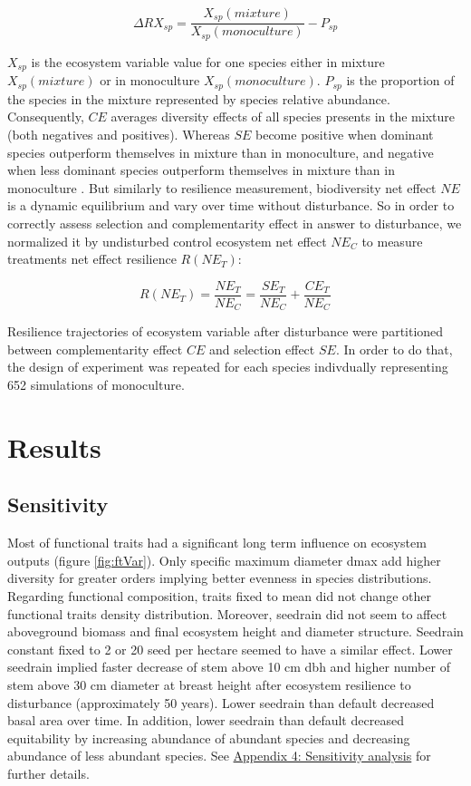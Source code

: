 \documentclass[12pt,]{article}
\let\oldsection\section
\renewcommand\section{\newpage\oldsection}
\theoremstyle{definition}
\theoremstyle{definition}
\theoremstyle{remark}
\begin{document}
\begin{equation}
  \Delta RX_{sp} = \frac{X_{sp}(mixture)}{X_{sp}(monoculture)} - P_{sp}
  \label{eq:DeltaRY}
\end{equation}

\(X_{sp}\) is the ecosystem variable value for one species either in
mixture \(X_{sp}(mixture)\) or in monoculture \(X_{sp}(monoculture)\).
\(P_{sp}\) is the proportion of the species in the mixture represented
by species relative abundance. Consequently, \(CE\) averages diversity
effects of all species presents in the mixture (both negatives and
positives). Whereas \(SE\) become positive when dominant species
outperform themselves in mixture than in monoculture, and negative when
less dominant species outperform themselves in mixture than in
monoculture \citep{Tobner2016}. But similarly to resilience measurement,
biodiversity net effect \(NE\) is a dynamic equilibrium and vary over
time without disturbance. So in order to correctly assess selection and
complementarity effect in answer to disturbance, we normalized it by
undisturbed control ecosystem net effect \(NE_C\) to measure treatments
net effect resilience \(R(NE_T)\):

\begin{equation}
  R(NE_T) = \frac{NE_T}{NE_C} = \frac{SE_T}{NE_C} + \frac{CE_T}{NE_C}
  \label{eq:RNE}
\end{equation}

Resilience trajectories of ecosystem variable after disturbance were
partitioned between complementarity effect \(CE\) and selection effect
\(SE\). In order to do that, the design of experiment was repeated for
each species indivdually representing 652 simulations of monoculture.

\section{Results}\label{results}

\subsection{Sensitivity}\label{sensitivity}

Most of functional traits had a significant long term influence on
ecosystem outputs (figure \ref{fig:ftVar}). Only specific maximum
diameter dmax add higher diversity for greater orders implying better
evenness in species distributions. Regarding functional composition,
traits fixed to mean did not change other functional traits density
distribution. Moreover, seedrain did not seem to affect aboveground
biomass and final ecosystem height and diameter structure. Seedrain
constant fixed to 2 or 20 seed per hectare seemed to have a similar
effect. Lower seedrain implied faster decrease of stem above 10 cm dbh
and higher number of stem above 30 cm diameter at breast height after
ecosystem resilience to disturbance (approximately 50 years). Lower
seedrain than default decreased basal area over time. In addition, lower
seedrain than default decreased equitability by increasing abundance of
abundant species and decreasing abundance of less abundant species. See
\protect\hyperlink{appendix-4-sensitivity-analysis}{Appendix 4:
Sensitivity analysis} for further details.
\end{document}
